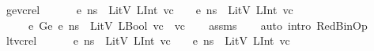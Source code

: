 \begin{isabellebody}
\endisatagproof
{\isafoldproof}%
%
\isadelimproof
\isanewline
%
\endisadelimproof
\isanewline
{}\isamarkupfalse%
\ ge{\isacharunderscore}{\kern0pt}vc{\isacharunderscore}{\kern0pt}rel{\isacharcolon}{\kern0pt}\ \isanewline
\ \ \ {\isachardoublequoteopen}{\isasymLambda}{\isacharcomma}{\kern0pt}{\isasymGamma}{\isacharcomma}{\kern0pt}{\isasymOmega}\ {\isasymturnstile}\ {\isasymlangle}e{}{\isacharcomma}{\kern0pt}\ ns{\isasymrangle}\ {\isasymDown}\ LitV\ {\isacharparenleft}{\kern0pt}LInt\ vc{}{\isacharparenright}{\kern0pt}{\isachardoublequoteclose}\ \ {\isachardoublequoteopen}{\isasymLambda}{\isacharcomma}{\kern0pt}{\isasymGamma}{\isacharcomma}{\kern0pt}{\isasymOmega}\ {\isasymturnstile}\ {\isasymlangle}e{}{\isacharcomma}{\kern0pt}\ ns{\isasymrangle}\ {\isasymDown}\ LitV\ {\isacharparenleft}{\kern0pt}LInt\ vc{}{\isacharparenright}{\kern0pt}{\isachardoublequoteclose}\isanewline
\ \ \ {\isachardoublequoteopen}{\isasymLambda}{\isacharcomma}{\kern0pt}{\isasymGamma}{\isacharcomma}{\kern0pt}{\isasymOmega}\ {\isasymturnstile}\ {\isasymlangle}e{}\ {\isasymguillemotleft}Ge{\isasymguillemotright}\ e{}{\isacharcomma}{\kern0pt}\ ns{\isasymrangle}\ {\isasymDown}\ LitV\ {\isacharparenleft}{\kern0pt}LBool\ {\isacharparenleft}{\kern0pt}vc{}\ {\isasymge}\ vc{}{\isacharparenright}{\kern0pt}{\isacharparenright}{\kern0pt}{\isachardoublequoteclose}\isanewline
%
\isadelimproof
\ \ %
\endisadelimproof
%
\isatagproof
{}\isamarkupfalse%
\ assms\isanewline
\ \ \isamarkupfalse%
\ {\isacharparenleft}{\kern0pt}auto\ intro{\isacharcolon}{\kern0pt}\ RedBinOp{\isacharparenright}{\kern0pt}%
\endisatagproof
{\isafoldproof}%
%
\isadelimproof
\isanewline
%
\endisadelimproof
\isanewline
{}\isamarkupfalse%
\ lt{\isacharunderscore}{\kern0pt}vc{\isacharunderscore}{\kern0pt}rel{\isacharcolon}{\kern0pt}\ \isanewline
\ \ \ {\isachardoublequoteopen}{\isasymLambda}{\isacharcomma}{\kern0pt}{\isasymGamma}{\isacharcomma}{\kern0pt}{\isasymOmega}\ {\isasymturnstile}\ {\isasymlangle}e{}{\isacharcomma}{\kern0pt}\ ns{\isasymrangle}\ {\isasymDown}\ LitV\ {\isacharparenleft}{\kern0pt}LInt\ vc{}{\isacharparenright}{\kern0pt}{\isachardoublequoteclose}\ \ {\isachardoublequoteopen}{\isasymLambda}{\isacharcomma}{\kern0pt}{\isasymGamma}{\isacharcomma}{\kern0pt}{\isasymOmega}\ {\isasymturnstile}\ {\isasymlangle}e{}{\isacharcomma}{\kern0pt}\ ns{\isasymrangle}\ {\isasymDown}\ LitV\ {\isacharparenleft}{\kern0pt}LInt\ vc{}{\isacharparenright}{\kern0pt}{\isachardoublequoteclose}\isanewline

\end{isabellebody}
